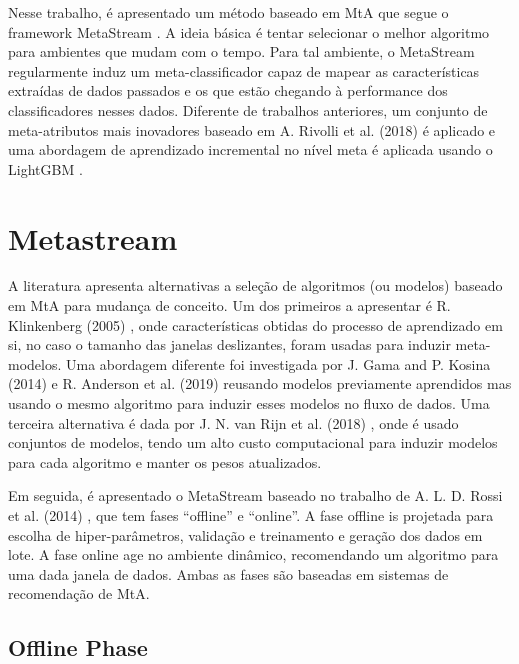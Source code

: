 Nesse trabalho, é apresentado um método baseado em MtA que segue o framework MetaStream \cite{rossi2014metastream}.
A ideia básica é tentar selecionar o melhor algoritmo para ambientes que mudam com o tempo.
Para tal ambiente, o MetaStream regularmente induz um meta-classificador capaz de mapear as características extraídas de dados passados e os que estão chegando à performance dos classificadores nesses dados.
Diferente de trabalhos anteriores, um conjunto de meta-atributos mais inovadores baseado em A. Rivolli et al. (2018) \cite{Rivolli2018} é aplicado e uma abordagem de aprendizado incremental no nível meta é aplicada usando o LightGBM \cite{ke2017lightgbm}.

\section{Metastream}
\label{sec:metastream}

A literatura apresenta alternativas a seleção de algoritmos (ou modelos) baseado em MtA para mudança de conceito. Um dos primeiros a apresentar é R. Klinkenberg (2005) \cite{klinkenberg2005}, onde características obtidas do processo de aprendizado em si, no caso o tamanho das janelas deslizantes, foram usadas para induzir meta-modelos.
Uma abordagem diferente foi investigada por J. Gama and P. Kosina (2014) \cite{gama2014} e R. Anderson et al. (2019) \cite{Anderson2019}
reusando modelos previamente aprendidos mas usando o mesmo algoritmo para induzir esses modelos no fluxo de dados. Uma terceira alternativa é dada por J. N. van Rijn et al. (2018) \cite{VanRijn2018}, onde é usado conjuntos de modelos, tendo um alto custo computacional para induzir modelos para cada algoritmo e manter os pesos atualizados.

Em seguida, é apresentado o MetaStream baseado no trabalho de A. L. D. Rossi et al. (2014) \cite{rossi2014metastream}, que tem fases ``offline'' e ``online''.
A fase offline is projetada para escolha de hiper-parâmetros, validação e treinamento e geração dos dados em lote.
A fase online age no ambiente dinâmico, recomendando um algoritmo para uma dada janela de dados. Ambas as fases são baseadas em sistemas de recomendação de MtA.


\subsection{Offline Phase}
\label{subsubsec:offline}


